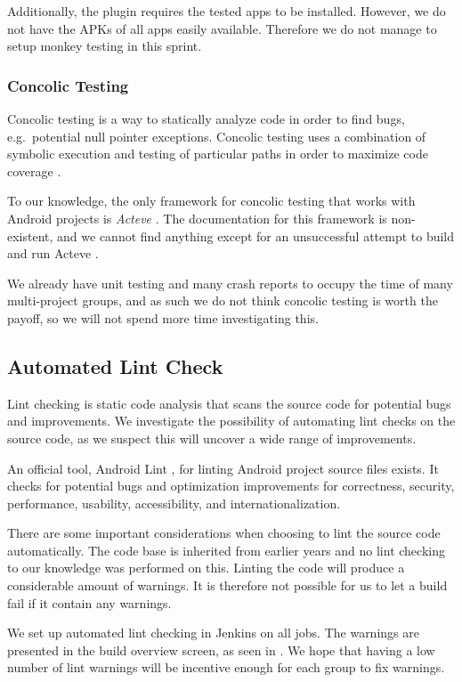 Additionally, the plugin requires the tested apps to be installed. However, we do not have the APKs of all apps easily available. Therefore we do not manage to setup monkey testing in this sprint.

\subsubsection{Concolic Testing}
Concolic testing is a way to statically analyze code in order to find bugs, e.g.\ potential null pointer exceptions. Concolic testing uses a combination of symbolic execution and testing of particular paths in order to maximize code coverage \parencite{concolic_testing_2015}.

To our knowledge, the only framework for concolic testing that works with Android projects is \emph{Acteve} \parencite{AnandNHY12, AnandH11}. The documentation for this framework is non-existent, and we cannot find anything except for an unsuccessful attempt to build and run Acteve \parencite{chenxiong-acteve}.

We already have unit testing and many crash reports to occupy the time of many multi-project groups, and as such we do not think concolic testing is worth the payoff, so we will not spend more time investigating this.

\subsection{Automated Lint Check}\label{sec:automated_lint}
Lint checking is static code analysis that scans the source code for potential bugs and improvements. We investigate the possibility of automating lint checks on the source code, as we suspect this will uncover a wide range of improvements.

An official tool, Android Lint \parencite{AndroidLint}, for linting Android project source files exists. It checks for potential bugs and optimization improvements for correctness, security, performance, usability, accessibility, and internationalization.

There are some important considerations when choosing to lint the source code automatically. The code base is inherited from earlier years and no lint checking to our knowledge was performed on this. Linting the code will produce a considerable amount of warnings. It is therefore not possible for us to let a build fail if it contain any warnings.

We set up automated lint checking in Jenkins on all jobs. The warnings are presented in the build overview screen, as seen in . We hope that having a low number of lint warnings will be incentive enough for each group to fix warnings.


